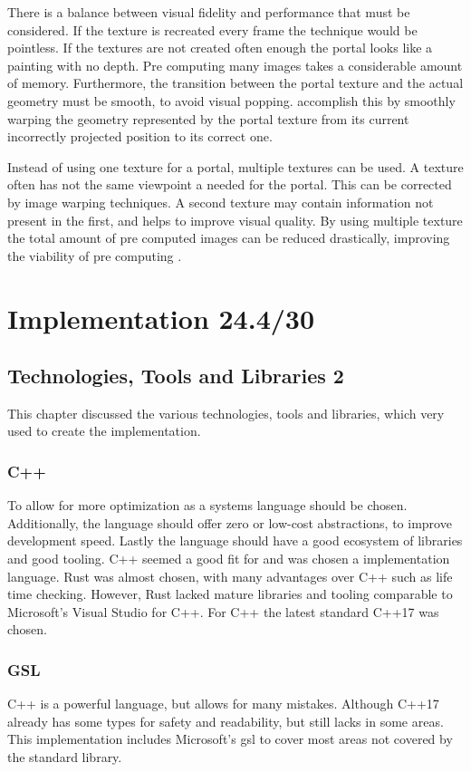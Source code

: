 There is a balance between visual fidelity and performance that must be considered. If the texture is recreated every frame the technique would be pointless. If the textures are not created often enough the portal looks like a painting with no depth. Pre computing many images takes a considerable amount of memory. Furthermore, the transition between the portal texture and the actual geometry must be smooth, to avoid visual popping. \textcite{aliaga:1997:architectural} accomplish this by smoothly warping the geometry represented by the portal texture from its current incorrectly projected position to its correct one.

Instead of using one texture for a portal, multiple textures can be used. A texture often has not the same viewpoint a needed for the portal. This can be corrected by image warping techniques. A second texture may contain information not present in the first, and helps to improve visual quality. By using multiple texture the total amount of pre computed images can be reduced drastically, improving the viability of pre computing \cite{rafferty:1998:3d}.


\section{Implementation 24.4/30}

\subsection{Technologies, Tools and Libraries 2}
This chapter discussed the various technologies, tools and libraries, which very used to create the implementation.

\subsubsection{C++}
To allow for more optimization as a systems language should be chosen. Additionally, the language should offer zero or low-cost abstractions, to improve development speed. Lastly the language should have a good ecosystem of libraries and good tooling. C++ seemed a good fit for and was chosen a implementation language. Rust \cite{rustlang} was almost chosen, with many advantages over C++ such as life time checking. However, Rust lacked mature libraries and tooling comparable to Microsoft's Visual Studio \cite{microsoft:visualstudio} for C++. For C++ the latest standard C++17 was chosen.

\subsubsection{GSL}
C++ is a powerful language, but allows for many mistakes. Although C++17 already has some types for safety and readability, but still lacks in some areas. This implementation includes Microsoft's \gls{gsl} \cite{microsoft:gsl} to cover most areas not covered by the standard library.


